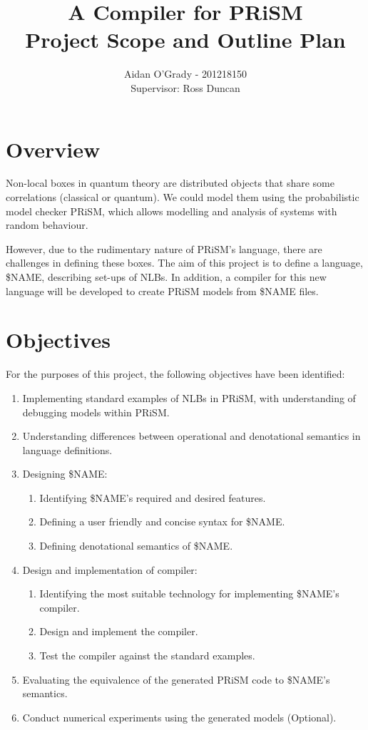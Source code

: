 \documentclass[11pt, a4paper]{article}
\begin{document}
\title{A Compiler for PRiSM \\
\large{Project Scope and Outline Plan}}
\author{Aidan O'Grady - 201218150\\Supervisor: Ross Duncan}
\date{}
\maketitle
\newpage

\section{Overview} %
\label{sec:overview}
Non-local boxes in quantum theory are distributed objects that share some
correlations (classical or quantum). We could model them using the probabilistic
model checker PRiSM, which allows modelling and analysis of systems with random
behaviour.

However, due to the rudimentary nature of PRiSM's language, there are
challenges in defining these boxes. The aim of this project is to define a
language, \$NAME, describing set-ups of NLBs. In addition, a compiler for this
new language will be developed to create PRiSM models from \$NAME files.


\section{Objectives} %
\label{sec:objectives}
For the purposes of this project, the following objectives have been identified:
\begin{enumerate}
    \item Implementing standard examples of NLBs in PRiSM, with understanding of
    debugging models within PRiSM.
    \item Understanding differences between operational and denotational
    semantics in language definitions.
    \item Designing \$NAME:
    \begin{enumerate}
        \item Identifying \$NAME's required and desired features.
        \item Defining a user friendly and concise syntax for \$NAME.
        \item Defining denotational semantics of \$NAME.
    \end{enumerate}
    \item Design and implementation of compiler:
    \begin{enumerate}
        \item Identifying the most suitable technology for implementing \$NAME's
        compiler.
        \item Design and implement the compiler.
        \item Test the compiler against the standard examples.
    \end{enumerate}
    \item Evaluating the equivalence of the generated PRiSM code to \$NAME's
    semantics.
    \item Conduct numerical experiments using the generated models (Optional).
\end{enumerate}
\end{document}
